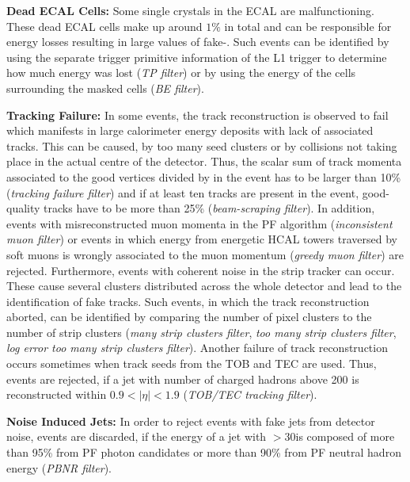 \begin{description}
 \item{\textbf{Dead ECAL Cells:}} Some single crystals in the ECAL are malfunctioning. These dead ECAL cells make up around $1\%$ in total and can be responsible for energy losses resulting in large values of fake-\MHT. Such events can be identified by using the separate trigger primitive information of the L1 trigger to determine how much energy was lost (\textit{TP filter}) or by using the energy of the cells surrounding the masked cells (\textit{BE filter}).
 \item{\textbf{Tracking Failure:}} In some events, the track reconstruction is observed to fail which manifests in large calorimeter energy deposits with lack of associated tracks. This can be caused, \eg by too many seed clusters or by collisions not taking place in the actual centre of the detector. Thus, the scalar sum of track momenta associated to the good vertices divided by \HT in the event has to be larger than 10\% (\textit{tracking failure filter}) and if at least ten tracks are present in the event, good-quality tracks have to be more than 25\% (\textit{beam-scraping filter}). In addition, events with misreconstructed muon momenta in the PF algorithm (\textit{inconsistent muon filter}) or events in which energy from energetic HCAL towers traversed by soft muons is wrongly associated to the muon momentum (\textit{greedy muon filter}) are rejected. Furthermore, events with coherent noise in the strip tracker can occur. These cause several clusters distributed across the whole detector and lead to the identification of fake tracks. Such events, in which the track reconstruction aborted, can be identified by comparing the number of pixel clusters to the number of strip clusters (\textit{many strip clusters filter}, \textit{too many strip clusters filter}, \textit{log error too many strip clusters filter}). Another failure of track reconstruction occurs sometimes when track seeds from the TOB and TEC are used. Thus, events are rejected, if a jet with number of charged hadrons above 200 is reconstructed within $0.9 < |\eta| < 1.9$ (\textit{TOB/TEC tracking filter}).
 \item{\textbf{Noise Induced Jets:}} In order to reject events with fake jets from detector noise, events are discarded, if the energy of a jet with \pt$ > 30$\gev is composed of more than 95\% from PF photon candidates or more than 90\% from PF neutral hadron energy (\textit{PBNR filter}).
\end{description}

